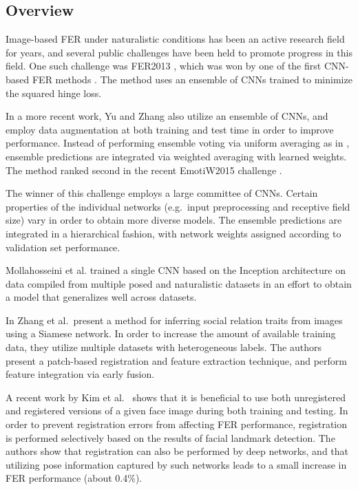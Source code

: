 \documentclass[conference,10pt,a4paper]{IEEEtran}
\begin{document}
\subsection{Overview} \label{sub:sota_overview}

Image-based FER under naturalistic conditions has been an active research field for years, and several public challenges have been held to promote progress in this field. One such challenge was FER2013 \cite{goodfellow15}, which was won by one of the first CNN-based FER methods \cite{tang13}. The method uses an ensemble of CNNs trained to minimize the squared hinge loss.

In a more recent work, Yu and Zhang \cite{yu15} also utilize an ensemble of CNNs, and employ data augmentation at both training and test time in order to improve performance. Instead of performing ensemble voting via uniform averaging as in \cite{tang13}, ensemble predictions are integrated via weighted averaging with learned weights. The method ranked second in the recent EmotiW2015 challenge \cite{dhall15}.

The winner \cite{kim16} of this challenge employs a large committee of CNNs. Certain properties of the individual networks (e.g.\ input preprocessing and receptive field size) vary in order to obtain more diverse models. The ensemble predictions are integrated in a hierarchical fashion, with network weights assigned according to validation set performance.

Mollahosseini et al. \cite{mollahosseini15} trained a single CNN based on the Inception architecture \cite{szegedy15} on data compiled from multiple posed and naturalistic datasets in an effort to obtain a model that generalizes well across datasets.

In \cite{zhang2015} Zhang et al.\ present a method for inferring social relation traits from images using a Siamese network. In order to increase the amount of available training data, they utilize multiple datasets with heterogeneous labels. The authors present a patch-based registration and feature extraction technique, and perform feature integration via early fusion.

A recent work by Kim et al.\ \cite{kim16cvpr} shows that it is beneficial to use both unregistered and registered versions of a given face image during both training and testing. In order to prevent registration errors from affecting FER performance, registration is performed selectively based on the results of facial landmark detection. The authors show that registration can also be performed by deep networks, and that utilizing pose information captured by such networks leads to a small increase in FER performance (about 0.4\%).
\end{document}
